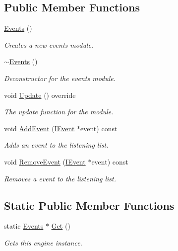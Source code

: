 \subsection*{Public Member Functions}
\begin{DoxyCompactItemize}
\item 
\hyperlink{class_flounder_1_1_events_a25d7a49abd86b07fbd2d51fb2003dbb9}{Events} ()
\begin{DoxyCompactList}\small\item\em Creates a new events module. \end{DoxyCompactList}\item 
\hyperlink{class_flounder_1_1_events_a944e4b67f8a646f9ab991c2e167bb1e7}{$\sim$\+Events} ()
\begin{DoxyCompactList}\small\item\em Deconstructor for the events module. \end{DoxyCompactList}\item 
void \hyperlink{class_flounder_1_1_events_a21906c6e0d40382ced06012612fd61f5}{Update} () override
\begin{DoxyCompactList}\small\item\em The update function for the module. \end{DoxyCompactList}\item 
void \hyperlink{class_flounder_1_1_events_a827cd4a1dc6cbff2441e9484e5062e9d}{Add\+Event} (\hyperlink{class_flounder_1_1_i_event}{I\+Event} $\ast$event) const
\begin{DoxyCompactList}\small\item\em Adds an event to the listening list. \end{DoxyCompactList}\item 
void \hyperlink{class_flounder_1_1_events_aaf73c654b75a06db59eecb45e3ac6cee}{Remove\+Event} (\hyperlink{class_flounder_1_1_i_event}{I\+Event} $\ast$event) const
\begin{DoxyCompactList}\small\item\em Removes a event to the listening list. \end{DoxyCompactList}\end{DoxyCompactItemize}
\subsection*{Static Public Member Functions}
\begin{DoxyCompactItemize}
\item 
static \hyperlink{class_flounder_1_1_events}{Events} $\ast$ \hyperlink{class_flounder_1_1_events_ac57b32d7e516abf96991cc764072a0b3}{Get} ()
\begin{DoxyCompactList}\small\item\em Gets this engine instance. \end{DoxyCompactList}\end{DoxyCompactItemize}
